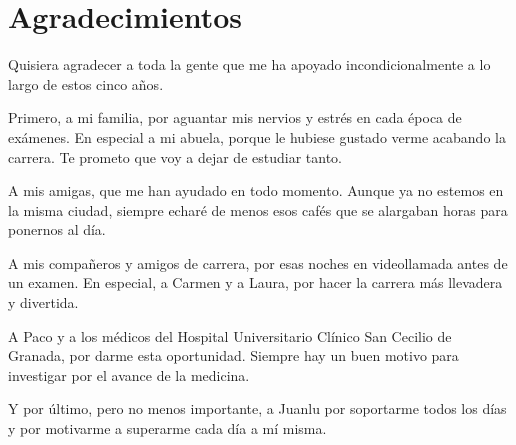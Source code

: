 

\chapter{Agradecimientos}

Quisiera agradecer a toda la gente que me ha apoyado incondicionalmente a lo largo de estos cinco años.

Primero, a mi familia, por aguantar mis nervios y estrés en cada época de exámenes. En especial a mi abuela, porque le hubiese gustado verme acabando la carrera. Te prometo que voy a dejar de estudiar tanto. 

A mis amigas, que me han ayudado en todo momento. Aunque ya no estemos en la misma ciudad, siempre echaré de menos esos cafés que se alargaban horas para ponernos al día.

A mis compañeros y amigos de carrera, por esas noches en videollamada antes de un examen. En especial, a Carmen y a Laura, por hacer la carrera más llevadera y divertida.

A Paco y a los médicos del Hospital Universitario Clínico San Cecilio de Granada, por darme esta oportunidad. Siempre hay un buen motivo para investigar por el avance de la medicina. 

Y por último, pero no menos importante, a Juanlu por soportarme todos los días y por motivarme a superarme cada día a mí misma. 

\cleardoublepage
\endinput
